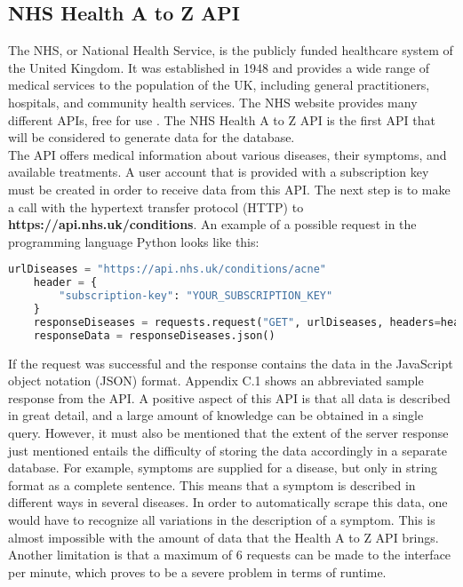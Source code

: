 \subsection{NHS Health A to Z API}
The NHS, or National Health Service, is the publicly funded healthcare system of the United Kingdom. It was established in 1948 and provides a wide range of medical services to the population of the UK, including general practitioners, hospitals, and community health services. The NHS website provides many different APIs, free for use \cite{.nhs}. The NHS Health A to Z API is the first API that will be considered to generate data for the database.
\newline \\
The API offers medical information about various diseases, their symptoms, and available treatments. A user account that is provided with a subscription key must be created in order to receive data from this API. The next step is to make a call with the hypertext transfer protocol (HTTP) to \textbf{https://api.nhs.uk/conditions}. An example of a possible request in the programming language Python looks like this:
\begin{lstlisting}[language=Python, caption={Example Python Request for the Health A to Z API}]
	urlDiseases = "https://api.nhs.uk/conditions/acne"
	header = {
		"subscription-key": "YOUR_SUBSCRIPTION_KEY"
	}
	responseDiseases = requests.request("GET", urlDiseases, headers=header)
	responseData = responseDiseases.json()
\end{lstlisting}
If the request was successful and the response contains the data in the JavaScript object notation (JSON) format. Appendix C.1 shows an abbreviated sample response from the API. A positive aspect of this API is that all data is described in great detail, and a large amount of knowledge can be obtained in a single query. However, it must also be mentioned that the extent of the server response just mentioned entails the difficulty of storing the data accordingly in a separate database. For example, symptoms are supplied for a disease, but only in string format as a complete sentence. This means that a symptom is described in different ways in several diseases. In order to automatically scrape this data, one would have to recognize all variations in the description of a symptom. This is almost impossible with the amount of data that the Health A to Z API brings. Another limitation is that a maximum of 6 requests can be made to the interface per minute, which proves to be a severe problem in terms of runtime.

